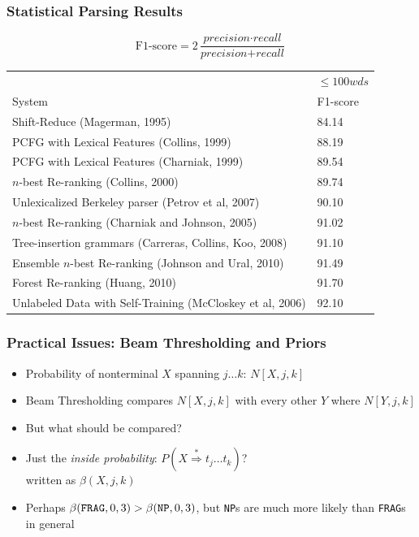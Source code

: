 \begin{frame}
\frametitle{Statistical Parsing Results}
\begin{center}
\footnotesize
\[ \textrm{F1-score} = 2 \frac{\textit{precision} \cdot \textit{recall}}{\textit{precision} + \textit{recall}} \]
\begin{tabular}{|p{7cm}|l|}
\hline
  & $\leq 100 wds$  \\
System & F1-score \\
\hline
Shift-Reduce (Magerman, 1995)   & 84.14 \\
PCFG with Lexical Features (Collins, 1999)    & 88.19 \\
PCFG with Lexical Features (Charniak, 1999)   & 89.54 \\
$n$-best Re-ranking (Collins, 2000)    & 89.74 \\
Unlexicalized Berkeley parser (Petrov et al, 2007) & 90.10 \\
$n$-best Re-ranking (Charniak and Johnson, 2005) & 91.02 \\
Tree-insertion grammars (Carreras, Collins, Koo, 2008) & 91.10 \\
Ensemble $n$-best Re-ranking (Johnson and Ural, 2010) & 91.49 \\
Forest Re-ranking (Huang, 2010) & 91.70 \\
\hline
Unlabeled Data with Self-Training (McCloskey et al, 2006) & 92.10 \\
\hline
\end{tabular}
\end{center}
\end{frame}

\begin{frame}
\frametitle{Practical Issues: Beam Thresholding and Priors}
\begin{itemize}
\item Probability of nonterminal $X$ spanning $j \ldots k$:
$N[X,j,k]$
\item Beam Thresholding compares $N[X,j,k]$ with every other $Y$
where $N[Y,j,k]$
\item But what should be compared?
\item Just the {\em inside probability}: $P(X \stackrel{*}{\Rightarrow} t_j
\ldots t_k)$?\\
written as $\beta(X, j, k)$
\item Perhaps $\beta(\mbox{\tt FRAG}, 0, 3) > \beta(\mbox{\tt NP}, 0,
3)$, but {\tt NP}s are much more likely than {\tt FRAG}s in general
\end{itemize}
\end{frame}


